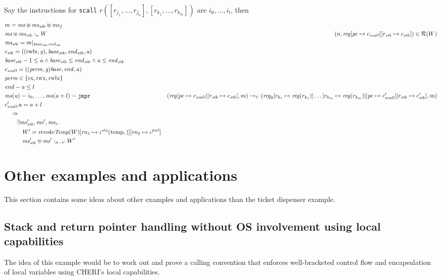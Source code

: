 \documentclass[a4paper]{article}
\newcommand{\var}[1]{\mathit{#1}}
\newcommand{\hs}{\var{ms}}
\newcommand{\ms}{\hs}
\newcommand{\gl}{\var{g}}
\newcommand{\pc}{\mathit{pc}}
\newcommand{\addr}{\var{a}}
\newcommand{\start}{\var{base}}
\newcommand{\addrend}{\var{end}}
\newcommand{\reg}{\var{reg}}
\newcommand{\heap}{\var{mem}}
\newcommand{\perm}{\var{perm}}
\newcommand{\stk}{\var{stk}}
\newcommand{\pwl}{\var{pwl}}
\newcommand{\sta}{\var{sta}}
\newcommand{\plainfun}[2]{
  \ifthenelse{\equal{#2}{}}
  {\mathit{#1}}
  {\mathit{#1}(#2)}
}
\newcommand{\revokeTemp}[1]{\plainfun{revokeTemp}{#1}}
\newcommand{\heapSat}[3][\heap]{#1 :_{#2} #3}
\newcommand{\memSat}[3][n]{\heapSat[#2]{#1}{#3}}
\newcommand{\asmType}{\plaindom{AsmType}}
\newcommand{\plaindom}[1]{\mathrm{#1}}
\newcommand{\intr}[2]{\mathcal{#1}}
\newcommand{\regintr}[1]{\intr{R}{#1}}
\newcommand{\stdrr}{\regintr{\asmType}}
\newcommand{\npair}[2][n]{\left(#1,#2 \right)}
\newcommand{\plainperm}[1]{\mathrm{#1}}
\newcommand{\exec}{\plainperm{rx}}
\newcommand{\rwx}{\plainperm{rwx}}
\newcommand{\rwlx}{\plainperm{rwlx}}
\newcommand{\plainview}[1]{\mathrm{#1}}
\newcommand{\temp}{\plainview{temp}}
\newcommand{\step}[1][]{\rightarrow_{#1}}
\begin{document}
\begin{lemma}
  Say the instructions for \texttt{scall} $r([r_{j_1},\dots,r_{j_n}],[r_{k_1},\dots, r_{k_m}])$ are $i_0,\dots,i_l$, then
  \begin{align*}
    & m = \ms \uplus \ms_\stk \uplus \ms_f \\
    & \memSat{\ms \uplus \ms_\stk}{W}
    & \npair{\reg[\pc \mapsto c_{\var{scall}}][r_\stk \mapsto c_\stk]} \in \stdrr(W) \\
    & \ms_\stk = m | _{\start_\stk,\addrend_\stk} \\
    & c_\stk = ((\rwlx,\gl),\start_\stk,\addrend_\stk,\addr) \\
    & \start_\stk-1 \leq \addr \land \start_\stk \leq \addrend_\stk \land \addr \leq \addrend_\stk \\
    & c_{\var{scall}} = ((\perm,\gl)\start,\addrend,\addr) \\
    & \perm \in \{\exec, \rwx, \rwlx\} \\
    & \addrend - \addr \leq l  \\
    & \ms(\addr) = i_0, \dots, \ms(\addr+l) = \mathtt{jmp r}
    & (\reg[\pc \mapsto c_{\var{scall}}][r_\stk \mapsto c_\stk],m) \step[i'] (\reg_0[r_{k_1} \mapsto \reg(r_{k_1})]\dots[r_{k_m} \mapsto \reg(r_{k_m})][\pc \mapsto c_{\var{scall}}'][r_\stk \mapsto c_\stk'],m) \\
    & c_{\var{scall}}'.\mathrm{a} = \addr+l \\
    & \quad \Rightarrow \\
    & \qquad \exists \ms_\stk', \ms', \ms_r \ldotp \\
    & \qquad \quad W' = \revokeTemp{W}[\var{rn}_1\mapsto\iota^\sta(\temp, )][\var{rn}_2 \mapsto \iota^\pwl] \\
    & \qquad \quad \memSat[n-i']{\ms_\stk'\uplus \ms'}{W'}
  \end{align*}
\end{lemma}

\section{Other examples and applications}
\label{sec:other_apps}
This section contains some ideas about other examples and applications than the
ticket dispenser example.

\subsection{Stack and return pointer handling without OS involvement using local
  capabilities}
The idea of this example would be to work out and prove a calling convention
that enforces well-bracketed control flow and encapsulation of local variables
using CHERI's local capabilities.
\end{document}
